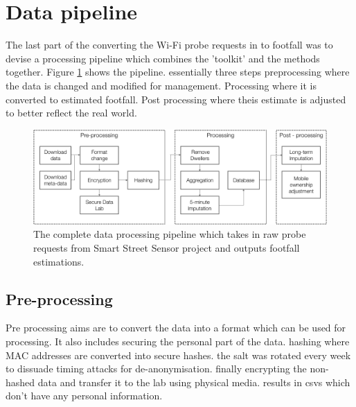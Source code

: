 \section{Data pipeline} \label{section:pipeline}

The last part of the converting the Wi-Fi probe requests in to footfall was to devise a processing pipeline which combines the 'toolkit' and the methods together.
Figure \ref{figure:processing:pipeline:full} shows the pipeline.
essentially three steps preprocessing where the data is changed and modified for management.
Processing where it is converted to estimated footfall. 
Post processing where theis estimate is adjusted to better reflect the real world.

\begin{figure}
  \includegraphics[trim={0 0 0 0},clip]{images/processing-pipeline-full.png}
  \caption{The complete data processing pipeline which takes in raw probe requests from Smart Street Sensor project and outputs footfall estimations.}
  \label{figure:processing:pipeline:full}
\end{figure}

\subsection{Pre-processing}
Pre processing aims are to convert the data into a format which can be used for processing.
It also includes securing the personal part of the data.
hashing where MAC addresses are converted into secure hashes.
the salt was rotated every week to dissuade timing attacks for de-anonymisation.
finally encrypting the non-hashed data and transfer it to the lab using physical media. 
results in csvs which don't have any personal information.

